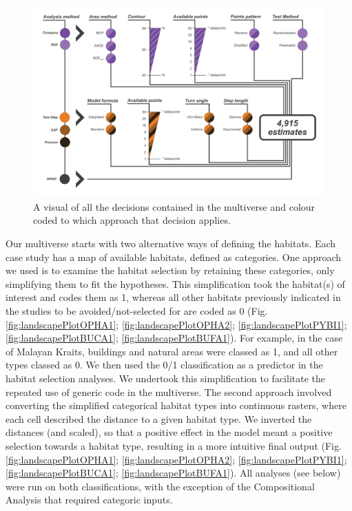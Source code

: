 \documentclass[10pt,a4paper]{article}
\begin{document}
\begin{figure}
\includegraphics[width=1\linewidth]{../ext_images/decisions_visual} \caption{A visual of all the decisions contained in the multiverse and colour coded to which approach that decision applies.}\label{fig:decisionsFigure}
\end{figure}

Our multiverse starts with two alternative ways of defining the habitats.
Each case study has a map of available habitats, defined as categories.
One approach we used is to examine the habitat selection by retaining these categories, only simplifying them to fit the hypotheses.
This simplification took the habitat(s) of interest and codes them as 1, whereas all other habitats previously indicated in the studies to be avoided/not-selected for are coded as 0 (Fig. \ref{fig:landscapePlotOPHA1}; \ref{fig:landscapePlotOPHA2}; \ref{fig:landscapePlotPYBI1}; \ref{fig:landscapePlotBUCA1}; \ref{fig:landscapePlotBUFA1}).
For example, in the case of Malayan Kraits, buildings and natural areas were classed as 1, and all other types classed as 0.
We then used the 0/1 classification as a predictor in the habitat selection analyses.
We undertook this simplification to facilitate the repeated use of generic code in the multiverse.
The second approach involved converting the simplified categorical habitat types into continuous rasters, where each cell described the distance to a given habitat type.
We inverted the distances (and scaled), so that a positive effect in the model meant a positive selection towards a habitat type, resulting in a more intuitive final output (Fig. \ref{fig:landscapePlotOPHA1}; \ref{fig:landscapePlotOPHA2}; \ref{fig:landscapePlotPYBI1}; \ref{fig:landscapePlotBUCA1}; \ref{fig:landscapePlotBUFA1}).
All analyses (see below) were run on both classifications, with the exception of the Compositional Analysis that required categoric inputs.
\end{document}
